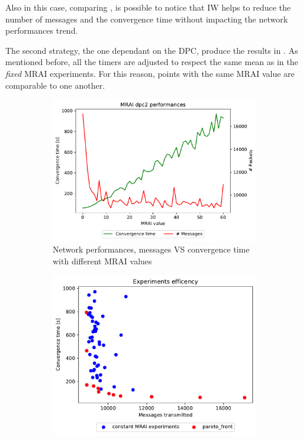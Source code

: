 Also in this case, comparing ,
is possible to notice that \ac{IW}
helps to reduce the number of messages and the convergence time without impacting
the network performances trend.

The second strategy, the one dependant on the \ac{DPC}, produce the results
in .
As mentioned before, all the timers are adjusted to respect the same mean as in
the \textit{fixed} \ac{MRAI} experiments.
For this reason, points with the same \ac{MRAI} value are comparable to one another.

\begin{figure}[h]
     \centering
     \begin{subfigure}[b]{0.503\textwidth}
         \centering
         \includegraphics[width=\textwidth]{images/internet_like/1000/dpc/internet_like-DPC_mrai_evolution.pdf}
		 \caption{Network performances, messages VS convergence time with different
			\ac{MRAI} values}
         \label{fig:internt_like_1000_DPC_evolution_evolution}
     \end{subfigure}
     \hfill
     \begin{subfigure}[b]{0.477\textwidth}
         \centering
         \includegraphics[width=\textwidth]{images/internet_like/1000/dpc/internet_like-DPC.pdf}

\end{subfigure}
\end{figure}
